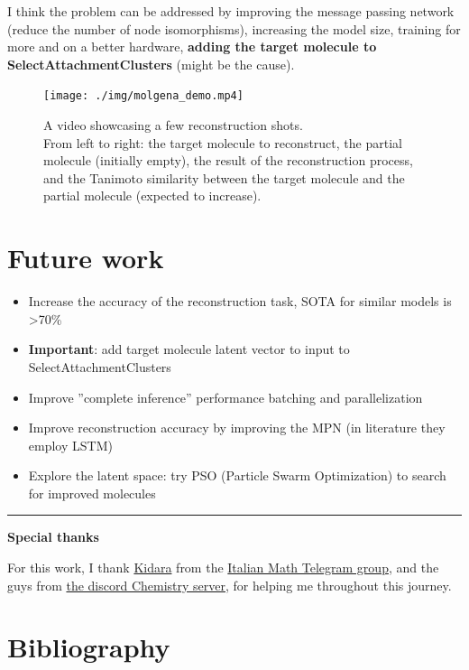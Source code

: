 \documentclass{article}
\begin{document}
I think the problem can be addressed by improving the message passing network (reduce the number of node isomorphisms),
increasing the model size, training for more and on a better hardware, \textbf{adding the target molecule to SelectAttachmentClusters} (might be the cause).

\begin{figure}[h]
\centering
\texttt{[image: ./img/molgena\_demo.mp4]}
\caption{
A video showcasing a few reconstruction shots.\\
From left to right: the target molecule to reconstruct, the partial molecule (initially empty), the result of the reconstruction process, and
the Tanimoto similarity between the target molecule and the partial molecule (expected to increase).
}
\end{figure}

\section{Future work}

\begin{itemize}
\item Increase the accuracy of the reconstruction task, SOTA for similar models is >70\%
\item \textbf{Important}: add target molecule latent vector to input to SelectAttachmentClusters
\item Improve ''complete inference'' performance batching and parallelization
\item Improve reconstruction accuracy by improving the MPN (in literature they employ LSTM)
\item Explore the latent space: try PSO (Particle Swarm Optimization) to search for improved molecules
\end{itemize}

\rule{}{0.5pt}

\textbf{Special thanks}

For this work, I thank \href{https://github.com/Kidara}{Kidara} from the \href{https://t.me/matematicaIT/369761}{Italian Math Telegram group},
and the guys from \href{https://discord.gg/jtD5nTyk}{the discord Chemistry server}, for helping me throughout this journey.

\section{Bibliography}

\printbibliography
\end{document}

